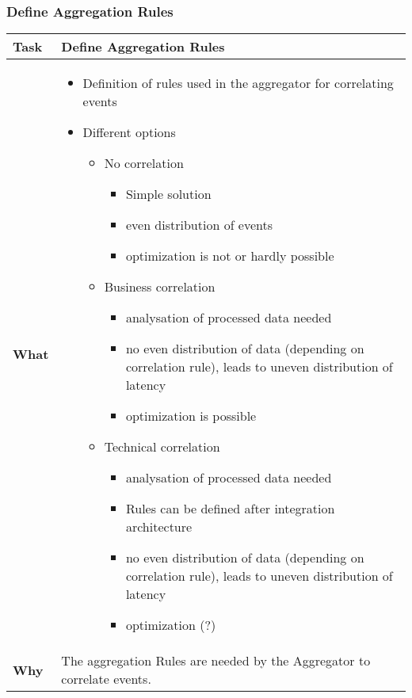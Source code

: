 \subsubsection{Define Aggregation Rules}
\begin{minipage}{\textwidth}
 \label{table:ch6_Task_Define_Aggregation_Rules}
\begin{tabular}
	{|m{3cm}|m{10cm}|} \hline \bfseries Task & Define Aggregation Rules\\
	\hline \bfseries What & 
	\begin{itemize}
		\item Definition of rules used in the aggregator for correlating events
		\item Different options
		\begin{itemize}
			\item No correlation
			\begin{itemize}
				\item Simple solution
				\item even distribution of events
				\item optimization is not or hardly possible
			\end{itemize}
			\item Business correlation
			\begin{itemize}
				\item analysation of processed data needed
				\item no even distribution of data (depending on correlation rule), leads to uneven distribution of latency
				\item optimization is possible
			\end{itemize}
			\item Technical correlation
			\begin{itemize}
				\item analysation of processed data needed
				\item Rules can be defined after integration architecture
				\item no even distribution of data (depending on correlation rule), leads to uneven distribution of latency
				\item optimization (?)
			\end{itemize}
		\end{itemize}
	\end{itemize}
	\\
	\hline \bfseries Why & The aggregation Rules are needed by the Aggregator to correlate events.\\

\end{tabular}
\end{minipage}
